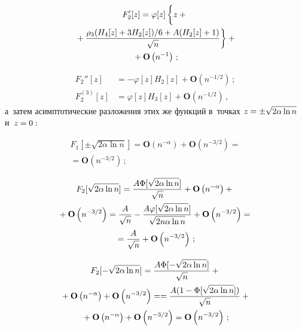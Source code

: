 \begin{multicols}{2}
 
 \noindent
 \begin{multline*}
F_2'[z] =\varphi[z]
 \left\{
 \vphantom{\fr{\rho_3 (H_4[z]+3H_2[z])/6+A (H_2[z]+1)}{\sqrt{n}}}
 z+{}\right.\\
\left. {}+\fr{\rho_3 (H_4[z]+3H_2[z])/6+A (H_2[z]+1)}{\sqrt{n}}\right\}
 +{}\\
 {}+\mathbf{O}\left(n^{-1}\right)\,;
 \end{multline*}
 
\vspace*{-9pt}
 
 \noindent
 \begin{align*}
F_2''[z] &=-\varphi[z]H_2[z]+\mathbf{O}\left(n^{-1/2}\right)\,;\\ %
 F_2^{(3)}[z] &=\varphi[z]H_3[z]+\mathbf{O}\left(n^{-1/2}\right)\,,
 \end{align*}
 а~затем асимптотические разложения этих же функций в~точках
 $z\hm=\pm\sqrt{2\alpha\ln n}$ и~$z\hm=0:$
 
 \noindent
 \begin{multline}
 F_1[\pm\sqrt{2\alpha\ln n}] =\mathbf{O}\left(n^{-\alpha}\right)
  +\mathbf{O}\left(n^{-3/2}\right)={}\\
  {}=\mathbf{O}\left(n^{-3/2}\right)\,;
 \label{e37-ch}
 \end{multline}
 
 \vspace*{-12pt}
 
 \noindent
 \begin{multline}
F_2[\sqrt{2\alpha\ln n}] =\displaystyle\frac{\displaystyle A\Phi[\sqrt{2\alpha\ln n}]\mathstrut}{\displaystyle \sqrt{n}\mathstrut}
  + \mathbf{O}\left(n^{-\alpha}\right) +{}\\
  {}+\mathbf{O}\left(n^{-3/2}\right)=
  \displaystyle\frac{\displaystyle A\mathstrut}{\displaystyle \sqrt{n}\mathstrut}-\displaystyle\frac{\displaystyle A\varphi[\sqrt{2\alpha\ln n}]\mathstrut}{\displaystyle \sqrt{2n\alpha\ln n}\mathstrut}
  + \mathbf{O}\left(n^{-3/2}\right)={}\\
  {}=\displaystyle\frac{\displaystyle A\mathstrut}{\displaystyle \sqrt{n}\mathstrut}
  + \mathbf{O}\left(n^{-3/2}\right)\,;
\label{e38-ch}
 \end{multline}

  \vspace*{-12pt}
 
 \noindent
 \begin{multline}
F_2[-\sqrt{2\alpha\ln n}] =\displaystyle\frac{\displaystyle A\Phi[-\sqrt{2\alpha\ln n}]\mathstrut}{\displaystyle \sqrt{n}\mathstrut}
   +{}\\
   {}+ \mathbf{O}\left(n^{-\alpha}\right) +\mathbf{O}\left(n^{-3/2}\right)=
=\displaystyle\frac{\displaystyle A(1-\Phi[\sqrt{2\alpha\ln n}])\mathstrut}{\displaystyle \sqrt{n}\mathstrut}+{}\\
{}  + \mathbf{O}\left(n^{-\alpha}\right) +\mathbf{O}\left(n^{-3/2}\right)
  = \mathbf{O}\left(n^{-3/2}\right)\,;
 \label{e39-ch}
 \end{multline}
 

\end{multicols}
